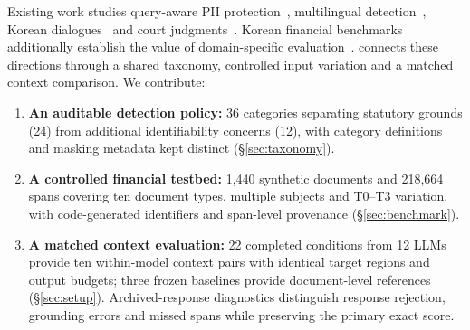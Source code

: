 Existing work studies query-aware PII protection~\cite{shen2025piibench}, multilingual detection~\cite{vats2026redact}, Korean dialogues~\cite{fei2024kdpii} and court judgments~\cite{hahm2025thunderdeid}. Korean financial benchmarks additionally establish the value of domain-specific evaluation~\cite{hwang2025twice,lee2025nmixx}. \kiii{} connects these directions through a shared taxonomy, controlled input variation and a matched context comparison. We contribute:
\begin{enumerate}
  \item \textbf{An auditable detection policy:} 36 categories separating statutory grounds (24) from additional identifiability concerns (12), with category definitions and masking metadata kept distinct (\S\ref{sec:taxonomy}).
  \item \textbf{A controlled financial testbed:} 1,440 synthetic documents and 218,664 spans covering ten document types, multiple subjects and T0--T3 variation, with code-generated identifiers and span-level provenance (\S\ref{sec:benchmark}).
  \item \textbf{A matched context evaluation:} 22 completed conditions from 12 LLMs provide ten within-model context pairs with identical target regions and output budgets; three frozen baselines provide document-level references (\S\ref{sec:setup}). Archived-response diagnostics distinguish response rejection, grounding errors and missed spans while preserving the primary exact score.
\end{enumerate}

